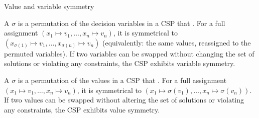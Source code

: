 \documentclass{cons-beamer}
\begin{document}
\begin{frame}{Value and variable symmetry}
  \begin{definition}
    A  $\sigma$ is a permutation of the decision variables in a CSP that .
    For a full assignment $(x_1 \mapsto v_1, \ldots, x_n \mapsto v_n)$, it is symmetrical to $(x_{\sigma(1)} \mapsto v_1, \ldots, x_{\sigma(n)} \mapsto v_n)$
    (equivalently: the same values, reassigned to the permuted variables).
    If two variables can be swapped without changing the set of solutions or violating any constraints, the CSP exhibits variable symmetry.
  \end{definition}

  \begin{definition}
    A  $\sigma$ is a permutation of the values in a CSP that .
    For a full assignment $(x_1 \mapsto v_1, \ldots, x_n \mapsto v_n)$, it is symmetrical to $(x_1 \mapsto \sigma(v_1), \ldots, x_n \mapsto \sigma(v_n))$.
    If two values can be swapped without altering the set of solutions or violating any constraints, the CSP exhibits value symmetry.
  \end{definition}
  \vfill

\end{frame}
\end{document}
